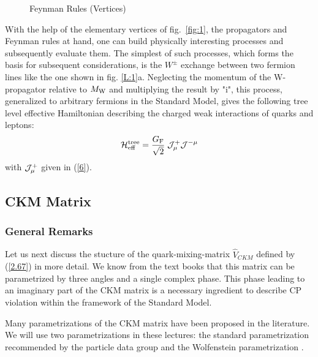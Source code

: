 \documentclass[12pt]{article}
\newcommand{\mw}{M_{\rm W}}
\begin{document}
\begin{itemize}
\begin{figure}[thb]
\centerline{
\epsfysize=9.5in
}
\vspace{-4.95in}
\caption[]{
Feynman Rules (Vertices)
\label{fig:3}}
\end{figure}

\noindent
With the help of the elementary vertices of fig.\ \ref{fig:1},
the propagators and  Feynman rules
at hand, one can build physically interesting
processes and subsequently evaluate them. The simplest of such
processes, which forms the basis for subsequent considerations, is the
$W^{\pm}$ exchange between two fermion lines like the one shown 
in fig. \ref{L:1}a.
Neglecting the momentum of the W-propagator relative to $\mw$ and
multiplying the result by "i",
this process, generalized to arbitrary fermions in the Standard Model,
 gives the following tree level effective Hamiltonian
describing the charged weak interactions of quarks and leptons:
\begin{equation}\label{WE}
{\cal H}^{\rm tree}_{\rm eff} = {{G_{\rm F}}\over{\sqrt2}}\;{\cal J}^+_\mu
{\cal J}^{-\mu}
\end{equation}
with ${\cal J}^+_\mu$  given in (\ref{6}).

\subsection{CKM Matrix}
\subsubsection{General Remarks}
Let us next discuss the stucture of the
quark-mixing-matrix $\hat V_{CKM}$ defined by (\ref{2.67}) in more
detail. We know from the text books that this matrix can be
parametrized by
three angles and a single complex phase.
This phase leading to an
imaginary part of the CKM matrix is a necessary ingredient to describe
CP violation within the framework of the Standard Model.

Many parametrizations of the CKM
matrix have been proposed in the literature.  We will use
two parametrizations in these lectures: the standard parametrization 
\cite{CHAU} recommended by the particle data group  \cite{PDG}  
and the Wolfenstein parametrization \cite{WO}.


\end{itemize}
\end{document}
